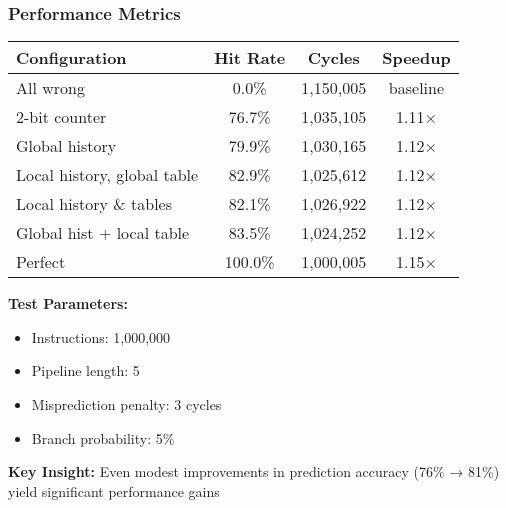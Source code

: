 \documentclass[aspectratio=169,12pt]{beamer}
\begin{document}
\begin{frame}
  \frametitle{Performance Metrics}
  
  \begin{center}
    \footnotesize
    \begin{tabular}{|l|c|c|c|}
      \hline
      \textbf{Configuration} & \textbf{Hit Rate} & \textbf{Cycles} & \textbf{Speedup} \\
      \hline
      All wrong & 0.0\% & 1,150,005 & baseline \\
      2-bit counter & 76.7\% & 1,035,105 & 1.11$\times$ \\
      Global history & 79.9\% & 1,030,165 & 1.12$\times$ \\
      Local history, global table & 82.9\% & 1,025,612 & 1.12$\times$ \\
      Local history \& tables & 82.1\% & 1,026,922 & 1.12$\times$ \\
      Global hist + local table & 83.5\% & 1,024,252 & 1.12$\times$ \\
      Perfect & 100.0\% & 1,000,005 & 1.15$\times$ \\
      \hline
    \end{tabular}
  \end{center}
  
  \vspace{1em}
  
  \begin{tcolorbox}[colback=yellow!10, colframe=yellow!50]
    \textbf{Test Parameters:}
    \begin{itemize}
      \item Instructions: 1,000,000
      \item Pipeline length: 5
      \item Misprediction penalty: 3 cycles
      \item Branch probability: 5\%
    \end{itemize}
  \end{tcolorbox}
  
  \textbf{Key Insight:} Even modest improvements in prediction accuracy (76\% → 81\%) yield significant performance gains
\end{frame}
\end{document}
